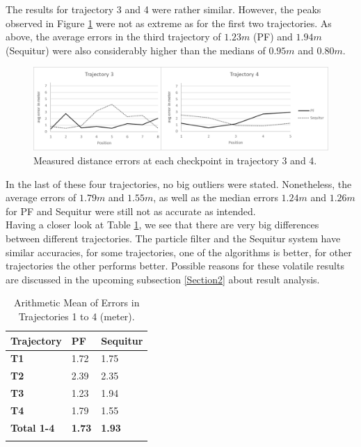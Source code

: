 The results for trajectory 3 and 4 were rather similar. However, the peaks observed in Figure \ref{fig:trajectory3and4_results} were not as extreme as for the first two trajectories. As above, the average errors in the third trajectory of $1.23m$ (PF) and $1.94m$ (Sequitur) were also considerably higher than the medians of $0.95m$ and $0.80m$.
\begin{figure}[th]
\centering
\includegraphics[width=1.0\textwidth]{Figures/trajectory3_4_results}
\decoRule
\caption[Localization Results of Trajectory 3 and 4]{Measured distance errors at each checkpoint in trajectory 3 and 4.}
\label{fig:trajectory3and4_results}
\end{figure}In the last of these four trajectories, no big outliers were stated. Nonetheless, the average errors of $1.79m$ and $1.55m$, as well as the median errors $1.24m$ and $1.26m$ for PF and Sequitur were still not as accurate as intended.\\
\noindent\hspace*{5mm}%
Having a closer look at Table \ref{tab:arithmetic_errors}, we see that there are very big differences between different trajectories. The particle filter and the Sequitur system have similar accuracies, for some trajectories, one of the algorithms is better, for other trajectories the other performs better. Possible reasons for these volatile results are discussed in the upcoming subsection  \ref{Section2} about result analysis. 

\begin{table}
\caption{Arithmetic Mean of Errors in Trajectories 1 to 4 (meter).}
\label{tab:arithmetic_errors}
\centering
\begin{tabular}{l l l}
\toprule
\textbf{Trajectory} & \textbf{PF} & \textbf{Sequitur}\\
\midrule
\textbf{T1} & 1.72 & 1.75\\
\textbf{T2} & 2.39 & 2.35\\
\textbf{T3} & 1.23 & 1.94\\
\textbf{T4} & 1.79 & 1.55\\
\midrule
\textbf{Total 1-4}  & \textbf{1.73} & \textbf{1.93}\\
\bottomrule\\
\end{tabular}
\end{table}

